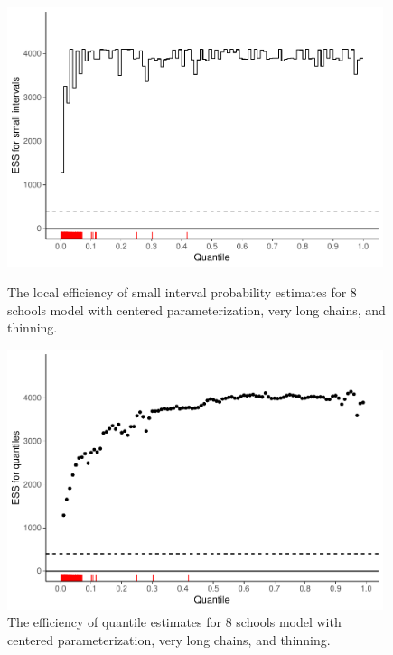 \documentclass[american,]{article}
\begin{document}
\begin{figure}[tp]
  \centering
  \begin{minipage}{0.48\textwidth}
  \includegraphics[width=0.98\textwidth]{graphics/local-ess-fit-cp4-tau-1.pdf}
  \caption{The local efficiency of small interval probability estimates for 8 schools model with centered parameterization, very long chains, and thinning.}
  \label{fig:local-ess-fit-cp4-tau-1}
\end{minipage}
\hfill
  \begin{minipage}{0.48\textwidth}
  \includegraphics[width=0.98\textwidth]{graphics/quantile-ess-fit-cp4-tau-1.pdf}
  \caption{The efficiency of quantile estimates for 8 schools model with centered parameterization, very long chains, and thinning.}
  \label{fig:quantile-ess-fit-cp4-tau-1}
\end{minipage}
\end{figure}
\end{document}
